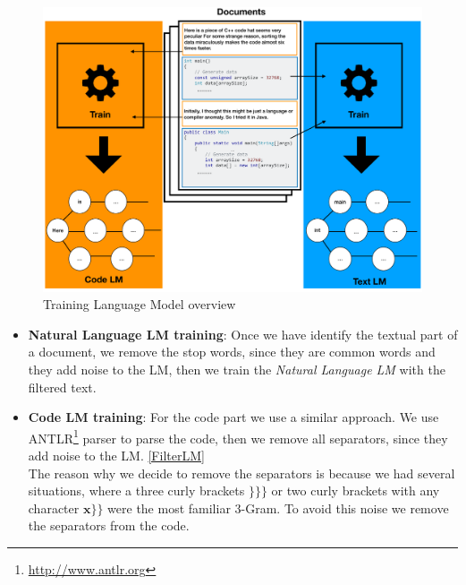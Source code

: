 \documentclass[12pt,mscthesis]{usiinfthesis}
\begin{document}
	\begin{figure}[htbp]
	\centering
	\includegraphics[width=\textwidth]{trainingLm}
	\caption{Training Language Model overview}
	\label{trainingLm}
	\end{figure}


	\begin{itemize}
		\item \textbf{Natural Language LM training}: Once we have identify the textual part of a document, we remove the stop words, since they are common words and they add noise to the LM, then we train the \emph{Natural Language LM} with the filtered text.
		\item \textbf{Code LM training}: For the code part we use a similar approach. We use ANTLR\footnote{\url{http://www.antlr.org}} parser to parse the code, then we remove all separators, since they add noise to the LM. \cref{FilterLM}\\
		The reason why we decide to remove the separators is because we had several situations, where a three curly brackets $\textbf{\}\}\}}$ or two curly brackets with any character $\textbf{x\}\}}$ were the most familiar 3-Gram. To avoid this noise we remove the separators from the code.
	\end{itemize}
	
\end{document}
